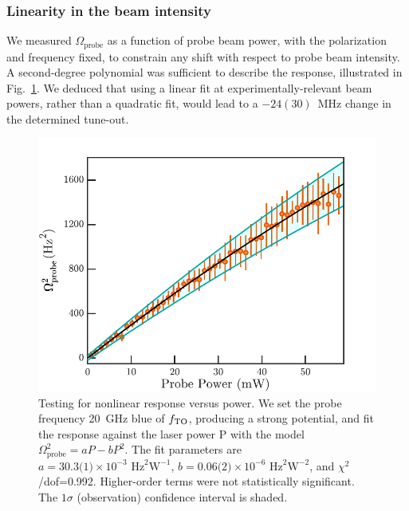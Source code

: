 \subsubsection{Linearity in the beam intensity}
	
	We measured \(\Omega_{\mathrm{probe}}\) as a function of probe beam power, with the polarization and frequency fixed, to constrain any shift with respect to probe beam intensity. A second-degree polynomial was sufficient to describe the response, illustrated in Fig.~\ref{fig:probe_beam_linearity}. 
	We deduced that using a linear fit at experimentally-relevant beam powers, rather than a quadratic fit, would lead to a  \(-24(30)\)~MHz change in the determined tune-out.

		\begin{figure}
	    \begin{minipage}{0.58\textwidth}
	    \vspace{0pt}
	    \includegraphics[width=\textwidth]{fig/tuneout/probe_beam_linearity}
	    \end{minipage}
	    \hfill
	    \begin{minipage}{0.4\textwidth}
	    \vspace{0pt}
	    \caption{Testing for nonlinear response versus power. We set the  probe frequency 20~GHz blue of $f_\mathrm{TO}$,  producing a strong potential, and fit the response against the laser power P with the model \( \Omega_{\mathrm{probe}}^2 = a  P - b P^2 \).  The fit parameters are \(a=\text{30.3(1)}\times 10^{-3}\text{~Hz}^2\text{W}^{-1}\), \(b= \text{0.06(2)} \times 10^{-6}\text{~Hz}^2\text{W}^{-2}\), and $\chi^2$/dof=0.992. Higher-order terms  were not statistically significant. The \(1\sigma\) (observation) confidence interval is shaded. 	    }
	    \label{fig:probe_beam_linearity}
	    \end{minipage}
	\end{figure}


